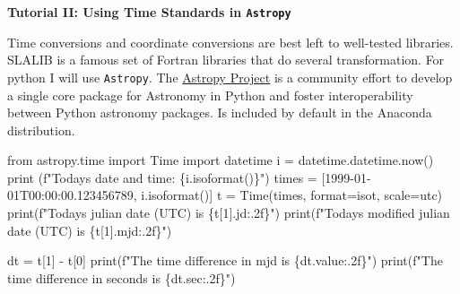 \documentclass[
  letterpaper,
  DIV=11,
  numbers=noendperiod]{scrreprt}
\newenvironment{Shaded}{\begin{snugshade}}{\end{snugshade}}
\newcommand{\BuiltInTok}[1]{\textcolor[rgb]{0.00,0.23,0.31}{#1}}
\newcommand{\DecValTok}[1]{\textcolor[rgb]{0.68,0.00,0.00}{#1}}
\newcommand{\ImportTok}[1]{\textcolor[rgb]{0.00,0.46,0.62}{#1}}
\newcommand{\NormalTok}[1]{\textcolor[rgb]{0.00,0.23,0.31}{#1}}
\newcommand{\OperatorTok}[1]{\textcolor[rgb]{0.37,0.37,0.37}{#1}}
\newcommand{\SpecialCharTok}[1]{\textcolor[rgb]{0.37,0.37,0.37}{#1}}
\newcommand{\SpecialStringTok}[1]{\textcolor[rgb]{0.13,0.47,0.30}{#1}}
\newcommand{\StringTok}[1]{\textcolor[rgb]{0.13,0.47,0.30}{#1}}
\begin{document}
\begin{tcolorbox}[enhanced jigsaw, toprule=.15mm, colframe=quarto-callout-color-frame, bottomrule=.15mm, leftrule=.75mm, left=2mm, breakable, rightrule=.15mm, arc=.35mm, opacityback=0, colback=white]

\vspace{-3mm}\textbf{Tutorial II: Using Time Standards in \texttt{Astropy}}\vspace{3mm}

Time conversions and coordinate conversions are best left to well-tested
libraries. SLALIB is a famous set of Fortran libraries that do several
transformation. For python I will use \texttt{Astropy}. The
\href{http://www.astropy.org/}{Astropy Project} is a community effort to
develop a single core package for Astronomy in Python and foster
interoperability between Python astronomy packages. Is included by
default in the Anaconda distribution.

\begin{Shaded}
\begin{Highlighting}[]
\ImportTok{from}\NormalTok{ astropy.time }\ImportTok{import}\NormalTok{ Time}
\ImportTok{import}\NormalTok{ datetime}
\NormalTok{i }\OperatorTok{=}\NormalTok{ datetime.datetime.now()}
\BuiltInTok{print}\NormalTok{ (}\SpecialStringTok{f"Today\textquotesingle{}s date and time: }\SpecialCharTok{\{}\NormalTok{i}\SpecialCharTok{.}\NormalTok{isoformat()}\SpecialCharTok{\}}\SpecialStringTok{"}\NormalTok{)}
\NormalTok{times }\OperatorTok{=}\NormalTok{ [}\StringTok{\textquotesingle{}1999{-}01{-}01T00:00:00.123456789\textquotesingle{}}\NormalTok{, i.isoformat()]}
\NormalTok{t }\OperatorTok{=}\NormalTok{ Time(times, }\BuiltInTok{format}\OperatorTok{=}\StringTok{\textquotesingle{}isot\textquotesingle{}}\NormalTok{, scale}\OperatorTok{=}\StringTok{\textquotesingle{}utc\textquotesingle{}}\NormalTok{)}
\BuiltInTok{print}\NormalTok{(}\SpecialStringTok{f"Today\textquotesingle{}s julian date (UTC) is }\SpecialCharTok{\{}\NormalTok{t[}\DecValTok{1}\NormalTok{]}\SpecialCharTok{.}\NormalTok{jd}\SpecialCharTok{:.2f\}}\SpecialStringTok{"}\NormalTok{)}
\BuiltInTok{print}\NormalTok{(}\SpecialStringTok{f"Today\textquotesingle{}s modified julian date (UTC) is }\SpecialCharTok{\{}\NormalTok{t[}\DecValTok{1}\NormalTok{]}\SpecialCharTok{.}\NormalTok{mjd}\SpecialCharTok{:.2f\}}\SpecialStringTok{"}\NormalTok{)}

\NormalTok{dt }\OperatorTok{=}\NormalTok{ t[}\DecValTok{1}\NormalTok{] }\OperatorTok{{-}}\NormalTok{ t[}\DecValTok{0}\NormalTok{]}
\BuiltInTok{print}\NormalTok{(}\SpecialStringTok{f"The time difference in mjd is }\SpecialCharTok{\{}\NormalTok{dt}\SpecialCharTok{.}\NormalTok{value}\SpecialCharTok{:.2f\}}\SpecialStringTok{"}\NormalTok{)}
\BuiltInTok{print}\NormalTok{(}\SpecialStringTok{f"The time difference in seconds is }\SpecialCharTok{\{}\NormalTok{dt}\SpecialCharTok{.}\NormalTok{sec}\SpecialCharTok{:.2f\}}\SpecialStringTok{"}\NormalTok{)}
\end{Highlighting}
\end{Shaded}


\end{tcolorbox}
\end{document}
